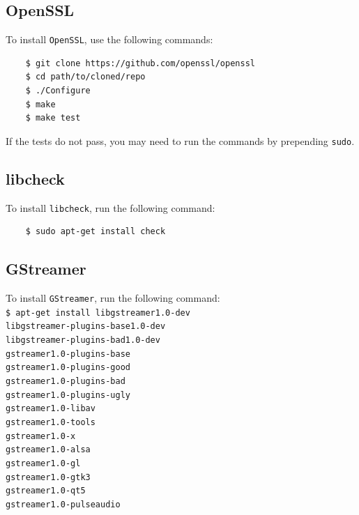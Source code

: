 \documentclass[a4paper,12pt]{article}
\begin{document}
\subsection{OpenSSL}

To install \texttt{OpenSSL}, use the following commands:

\begin{verbatim}
    $ git clone https://github.com/openssl/openssl
    $ cd path/to/cloned/repo
    $ ./Configure 
    $ make 
    $ make test
\end{verbatim}

If the tests do not pass, you may need to run the commands by prepending \texttt{sudo}.

\subsection{libcheck}

To install \texttt{libcheck}, run the following command:

\begin{verbatim}
    $ sudo apt-get install check
\end{verbatim}

\subsection{GStreamer}

To install \texttt{GStreamer}, run the following command: \\

\noindent
\texttt{\$ apt-get install libgstreamer1.0-dev} \\
\texttt{libgstreamer-plugins-base1.0-dev} \\
\texttt{libgstreamer-plugins-bad1.0-dev} \\
\texttt{gstreamer1.0-plugins-base} \\
\texttt{gstreamer1.0-plugins-good} \\
\texttt{gstreamer1.0-plugins-bad} \\
\texttt{gstreamer1.0-plugins-ugly} \\
\texttt{gstreamer1.0-libav} \\
\texttt{gstreamer1.0-tools} \\
\texttt{gstreamer1.0-x} \\
\texttt{gstreamer1.0-alsa} \\
\texttt{gstreamer1.0-gl} \\
\texttt{gstreamer1.0-gtk3} \\
\texttt{gstreamer1.0-qt5} \\
\texttt{gstreamer1.0-pulseaudio}
\end{document}

